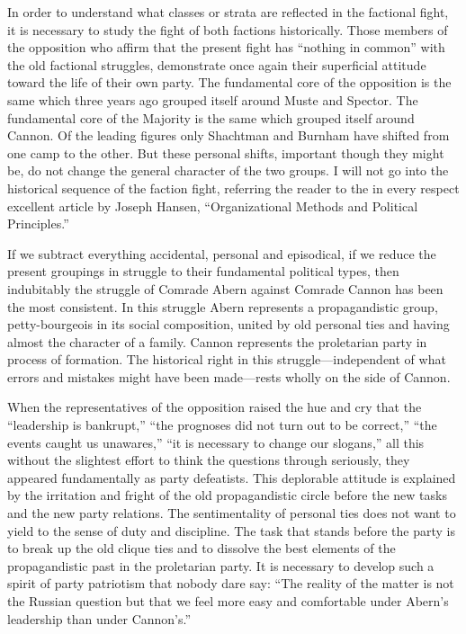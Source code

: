 In order to understand what classes or strata are reflected in the factional fight, it is necessary to study the fight of both factions historically. Those members of the opposition who affirm that the present fight has “nothing in common” with the old factional struggles, demonstrate once again their superficial attitude toward the life of their own party. The fundamental core of the opposition is the same which three years ago grouped itself around Muste and Spector. The fundamental core of the Majority is the same which grouped itself around Cannon. Of the leading figures only Shachtman and Burnham have shifted from one camp to the other. But these personal shifts, important though they might be, do not change the general character of the two groups. I will not go into the historical sequence of the faction fight, referring the reader to the in every respect excellent article by Joseph Hansen, ``Organizational Methods and Political Principles.''

If we subtract everything accidental, personal and episodical, if we reduce the present groupings in struggle to their fundamental political types, then indubitably the struggle of Comrade Abern against Comrade Cannon has been the most consistent. In this struggle Abern represents a propagandistic group, petty-bourgeois in its social composition, united by old personal ties and having almost the character of a family. Cannon represents the proletarian party in process of formation. The historical right in this struggle---independent of what errors and mistakes might have been made---rests wholly on the side of Cannon.
\noclub

When the representatives of the opposition raised the hue and cry that the “leadership is bankrupt,” “the prognoses did not turn out to be correct,” “the events caught us unawares,” “it is necessary to change our slogans,” all this without the slightest effort to think the questions through seriously, they appeared fundamentally as party defeatists. This deplorable attitude is explained by the irritation and fright of the old propagandistic circle before the new tasks and the new party relations. The sentimentality of personal ties does not want to yield to the sense of duty and discipline. The task that stands before the party is to break up the old clique ties and to dissolve the best elements of the propagandistic past in the proletarian party. It is necessary to develop such a spirit of party patriotism that nobody dare say: “The reality of the matter is not the Russian question but that we feel more easy and comfortable under Abern’s leadership than under Cannon’s.”

